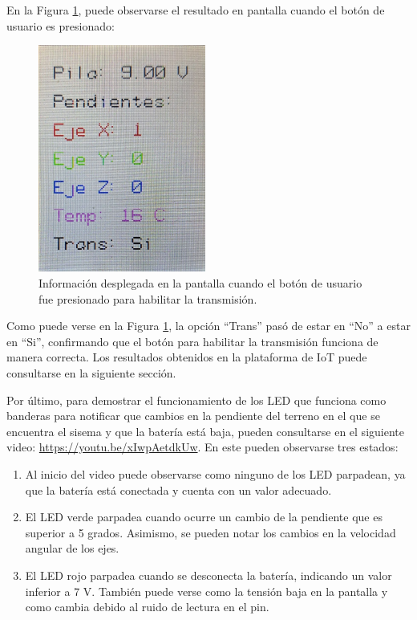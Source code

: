 En la Figura \ref{fig:STMb}, puede observarse el resultado en pantalla cuando el botón de usuario es presionado: 

\begin{figure}[H]
\centering
\includegraphics[width=55mm]{./Figuras/Desarrollo_Analisis/STMb}
\caption{Información desplegada en la pantalla cuando el botón de usuario fue presionado para habilitar la transmisión.} 
\label{fig:STMb}
\end{figure}

Como puede verse en la Figura \ref{fig:STMb}, la opción ``Trans'' pasó de estar en ``No'' a estar en ``Si'', confirmando que el botón para habilitar la transmisión funciona de manera correcta. Los resultados obtenidos en la plataforma de IoT puede consultarse en la siguiente sección. 

Por último, para demostrar el funcionamiento de los LED que funciona como banderas para notificar que cambios en la pendiente del terreno en el que se encuentra el sisema y que la batería está baja, pueden consultarse en el siguiente video: \url{https://youtu.be/xIwpAetdkUw}. En este pueden observarse tres estados: 

\begin{enumerate}
    \item Al inicio del video puede observarse como ninguno de los LED parpadean, ya que la batería está conectada y cuenta con un valor adecuado. 

    \item El LED verde parpadea cuando ocurre un cambio de la pendiente que es superior a 5 grados. Asimismo, se pueden notar los cambios en la velocidad angular de los ejes. 

    \item El LED rojo parpadea cuando se desconecta la batería, indicando un valor inferior a 7 V. También puede verse como la tensión baja en la pantalla y como cambia debido al ruido de lectura en el pin. 
\end{enumerate}

